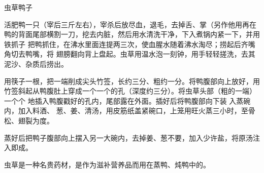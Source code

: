 \begin{recipe}{虫草鸭子}

\ingredients


\preparation

\step 活肥鸭一只（宰后三斤左右），宰杀后放尽血，退毛，去掉舌、掌（另作他用再在
鸭的背面尾部横割一刀，挖去内脏，然后用水清洗干净，下入煮锅内紧一下，并用铁抓子
把鸭抓住，在沸水里面连提两三次，使血腥水随着沸水淘尽；捞起后齐嘴角切去鸭嘴，将
翅膀翻向背上盘起。虫草用温水泡一刻钟，用手轻轻搓洗，去其泥沙、杂质后捞出。

\step 用筷子一根，把一端削成尖头竹签，长约三分、粗约一分。将鸭腹部向上放好，用
竹签斜起从鸭腹肚上穿成一个一个的孔（深度约三分）。将虫草头部（粗的一端）一个个
地插入鸭腹戳好的孔内，尾部露在外面。插好后将鸭腹部向下装 入蒸碗内，加入料酒、
葱、姜、清汤，用皮筋纸盖紧碗口，上笼用旺火蒸三小时，至骨松、翅裂为度。

\step 蒸好后把鸭子腹部向上摆入另一大碗内，去掉姜、葱不要，加入少许盐，将原汤注
入即成。

\features

虫草是一种名贵药材，是作为滋补营养品而用在蒸鸭、炖鸭中的。

\end{recipe}

